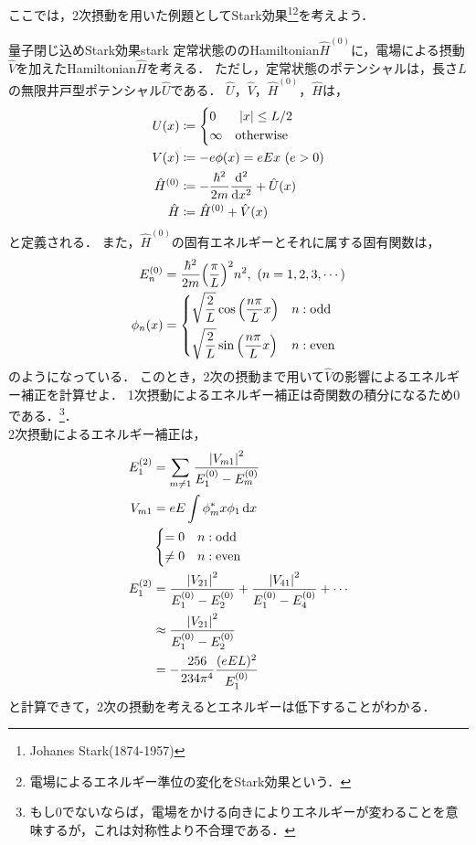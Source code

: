 \documentclass{report}
\begin{document}
  ここでは，2次摂動を用いた例題としてStark効果\footnote{Johanes Stark(1874-1957)}\footnote{電場によるエネルギー準位の変化をStark効果という．}を考えよう．
  \begin{myex}{量子閉じ込めStark効果}{stark}
    定常状態ののHamiltonian$\hat{H}^{(0)}$に，電場による摂動$\hat{V}$を加えたHamiltonian$\hat{H}$を考える．
    ただし，定常状態のポテンシャルは，長さ$L$の無限井戸型ポテンシャル$\hat{U}$である．
    $\hat{U}$，$\hat{V}$，$\hat{H}^{(0)}$，$\hat{H}$は，
    \begin{align}
      U(x) &\coloneqq
      \begin{dcases}
        0 & \ \abs{x}\leq L/2\\
        \infty & \text{otherwise}
      \end{dcases} \\ 
      V(x) &\coloneqq -e\phi(x) = eEx\ (e>0) \\ 
      \hat{H}^{(0)} &\coloneqq -\frac{\hbar^2}{2m}\dv[2]{x} + \hat{U}(x) \\ 
      \hat{H} &\coloneqq \hat{H}^{(0)} + \hat{V}(x) \\ 
    \end{align}
    と定義される．
    また，$\hat{H}^{(0)}$の固有エネルギーとそれに属する固有関数は，
    \begin{align}
      E_n^{(0)} &= \frac{\hbar^2}{2m}\qty(\frac{\pi}{L})^2n^2,\ (n = 1, 2, 3,\cdots)\\
      \phi_n(x)&=
      \begin{dcases}
        \sqrt{\frac{2}{L}}\cos\qty(\frac{n\pi}{L}x) & n: \mathrm{odd}\\
        \sqrt{\frac{2}{L}}\sin\qty(\frac{n\pi}{L}x) & n: \mathrm{even}
      \end{dcases}
    \end{align}
    のようになっている．
    このとき，2次の摂動まで用いて$\hat{V}$の影響によるエネルギー補正を計算せよ．
    \tcblower
    1次摂動によるエネルギー補正は奇関数の積分になるため0である．\footnote{もし0でないならば，電場をかける向きによりエネルギーが変わることを意味するが，これは対称性より不合理である．}．\\
    2次摂動によるエネルギー補正は，
    \begin{align}
      E_{1}^{(2)} &= \sum_{m\neq 1}\frac{\abs{V_{m1}}^2}{E_1^{(0)} - E_m^{(0)}}\\
      V_{m1} &= eE\int\phi_m^*x\phi_{1}\dd{x}\\
      &
      \begin{dcases}
      = 0 & n: \mathrm{odd}\\
      \neq 0 & n: \mathrm{even}
      \end{dcases}\\
      E_{1}^{(2)}&=\frac{\abs{V_{21}}^2}{E_1^{(0)} - E_2^{(0)}} + \frac{\abs{V_{41}}^2}{E_1^{(0)} - E_4^{(0)}} + \cdots\\
      &\approx \frac{\abs{V_{21}}^2}{E_1^{(0)} - E_2^{(0)}}\\
      &=-\frac{256}{234\pi^4}\frac{(eEL)^2}{E_1^{(0)}}
    \end{align}
    と計算できて，2次の摂動を考えるとエネルギーは低下することがわかる．
  \end{myex}
\end{document}
